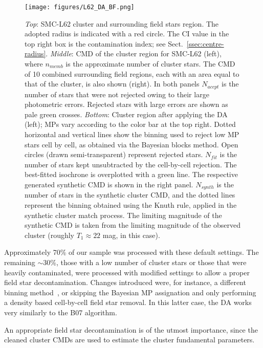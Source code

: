 \documentclass[draft]{aa}
\renewcommand{\includegraphics}[2][]{}
\begin{document}
\begin{figure}
\centering
\texttt{[image: figures/L62\_DA\_BF.png]}
\caption{\emph{Top}: SMC-L62 cluster and surrounding field stars
region. The adopted radius is indicated with a red circle. The CI value in the
top right box is the contamination index; see Sect.~\ref{ssec:centre-radius}.
%
\emph{Middle}: CMD of the cluster region for SMC-L62 (left),
where $n_{memb}$ is the approximate number of cluster stars. The CMD
of 10 combined surrounding field regions, each with an area equal to
that of the cluster, is also shown (right).
In both panels $N_{accpt}$ is the number of stars that were not rejected owing to
their large photometric errors. Rejected stars with large errors are shown as
pale green crosses.
%
\emph{Bottom}: Cluster region after applying the DA (left); MPs vary
according to the color bar at the top right. Dotted horizontal and vertical lines
show the binning used to reject low MP stars cell by cell, as obtained via the
Bayesian blocks method. Open circles (drawn semi-transparent) represent rejected
stars.
$N_{fit}$ is the number of stars kept unsubtracted by the cell-by-cell
rejection. The best-fitted isochrone is overplotted with a green line. 
The respective generated synthetic CMD is shown in the right panel. $N_{synth}$
is the number of stars in the synthetic cluster CMD, and the dotted lines
represent the binning obtained using the Knuth rule, applied in the synthetic
cluster match process. The limiting magnitude of the synthetic CMD is
taken from the limiting magnitude of the observed cluster (roughly
$T_1{\approx}22$ mag, in this case).}
\label{fig:DA_BF}
\end{figure}

Approximately 70\% of our sample was processed with these default settings.
The remaining ${\sim}$30\%, those with a low number of cluster stars
or those that were heavily contaminated, were processed with modified settings
to allow a proper field star decontamination.
Changes introduced were, for instance, a different binning
method~\citep[often a rectangular grid using the Scott rule;][]{Scott_1979},
or skipping the Bayesian MP assignation and only performing a density based
cell-by-cell field star removal. In this latter case, the DA works very
similarly to the B07 algorithm.

An appropriate field star decontamination is of the utmost importance, since the
cleaned cluster CMDs are used to estimate the cluster fundamental parameters.


\end{document}
